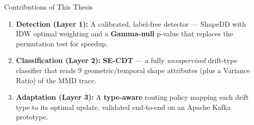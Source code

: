 \documentclass[aspectratio=169,10pt]{beamer}
\begin{document}
\begin{frame}{Contributions of This Thesis}
	\vfill
	\begin{enumerate}
		\item \textbf{Detection (Layer 1):} A calibrated, label-free detector --- ShapeDD with IDW optimal weighting and a \textbf{Gamma-null} p-value that replaces the permutation test for speedup.
		\vspace{0.5em}
		\item \textbf{Classification (Layer 2):} \textbf{SE-CDT} --- a fully \emph{unsupervised} drift-type classifier that reads 9 geometric/temporal shape attributes (plus a Variance Ratio) of the MMD trace.
		\vspace{0.5em}
		\item \textbf{Adaptation (Layer 3):} A \textbf{type-aware} routing policy mapping each drift type to its optimal update, validated end-to-end on an Apache Kafka prototype.
	\end{enumerate}
	\vfill
\end{frame}
\end{document}

